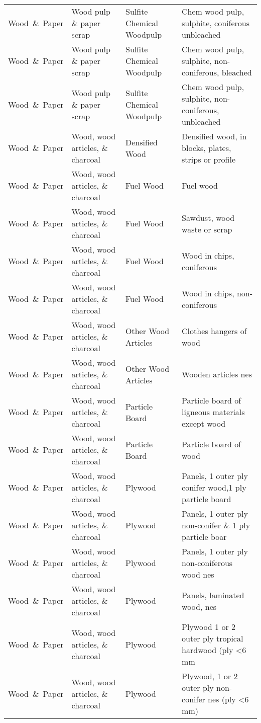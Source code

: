 \begin{appendices}
\begin{xltabular}{\textwidth}{|p{0.10\textwidth}|p{0.25\textwidth}|p{0.20\textwidth}|p{0.35\textwidth}|}
			Wood\ \&\ Paper & Wood pulp \& paper scrap & Sulfite Chemical Woodpulp & Chem wood pulp, sulphite, coniferous unbleached \\
			Wood\ \&\ Paper & Wood pulp \& paper scrap & Sulfite Chemical Woodpulp & Chem wood pulp, sulphite, non-coniferous, bleached \\
			Wood\ \&\ Paper & Wood pulp \& paper scrap & Sulfite Chemical Woodpulp & Chem wood pulp, sulphite, non-coniferous, unbleached \\
			Wood\ \&\ Paper & Wood, wood articles, \& charcoal & Densified Wood & Densified wood, in blocks, plates, strips or profile \\
			Wood\ \&\ Paper & Wood, wood articles, \& charcoal & Fuel Wood & Fuel wood \\
			Wood\ \&\ Paper & Wood, wood articles, \& charcoal & Fuel Wood & Sawdust, wood waste or scrap \\
			Wood\ \&\ Paper & Wood, wood articles, \& charcoal & Fuel Wood & Wood in chips, coniferous \\
			Wood\ \&\ Paper & Wood, wood articles, \& charcoal & Fuel Wood & Wood in chips, non-coniferous \\
			Wood\ \&\ Paper & Wood, wood articles, \& charcoal & Other Wood Articles & Clothes hangers of wood \\
			Wood\ \&\ Paper & Wood, wood articles, \& charcoal & Other Wood Articles & Wooden articles nes \\
			Wood\ \&\ Paper & Wood, wood articles, \& charcoal & Particle Board & Particle board of ligneous materials except wood \\
			Wood\ \&\ Paper & Wood, wood articles, \& charcoal & Particle Board & Particle board of wood \\
			Wood\ \&\ Paper & Wood, wood articles, \& charcoal & Plywood & Panels, 1 outer ply conifer wood,1 ply particle board \\
			Wood\ \&\ Paper & Wood, wood articles, \& charcoal & Plywood & Panels, 1 outer ply non-conifer \& 1 ply particle boar \\
			Wood\ \&\ Paper & Wood, wood articles, \& charcoal & Plywood & Panels, 1 outer ply non-coniferous wood nes \\
			Wood\ \&\ Paper & Wood, wood articles, \& charcoal & Plywood & Panels, laminated wood, nes \\
			Wood\ \&\ Paper & Wood, wood articles, \& charcoal & Plywood & Plywood 1 or 2 outer ply tropical hardwood (ply <6 mm \\
			Wood\ \&\ Paper & Wood, wood articles, \& charcoal & Plywood & Plywood, 1 or 2 outer ply non-conifer nes (ply <6 mm) \\

\end{xltabular}
\end{appendices}
